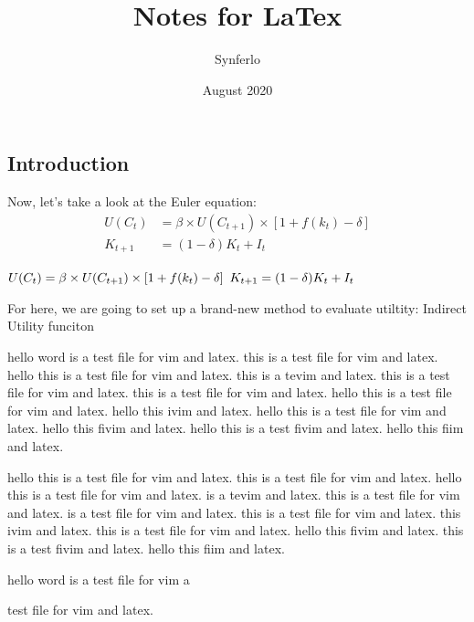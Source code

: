 \documentclass{article}
\title{Notes for LaTex}
\author{Synferlo}
\date{August 2020}
\begin{document}
\begin{spacing}{1.5}
\maketitle

\newpage
\section{Introduction}

Now, let's take a look at the Euler equation:\\

\begin{equation}
    \begin{aligned}
        U(C_{t})&=\beta\times U(C_{t+1})\times[1+f(k_{t})-\delta]\\
        K_{t+1}&=(1-\delta)K_{t} + I_{t}
    \end{aligned}
\end{equation}

 $U(C_{t})=\beta\times U(C_{t+1})\times[1+f(k_{t})-\delta]\\$
 $K_{t+1}=(1-\delta)K_{t} + I_{t}\\$


For here, we are going to set up a brand-new method to evaluate utiltity:
Indirect Utility funciton 


hello word is a test file for vim and latex.
this is a test file for vim and latex.
hello this is a test file for vim and latex.
this is a tevim and latex.
this is a test file for vim and latex.
this is a test file for vim and latex.
hello this is a test file for vim and latex.
hello this ivim and latex.
hello this is a test file for vim and latex.
hello this fivim and latex.
hello this is a test fivim and latex.
hello this fiim and latex.



hello this is a test file for vim and latex.
this is a test file for vim and latex.
hello this is a test file for vim and latex.
 is a tevim and latex.
this is a test file for vim and latex.
 is a test file for vim and latex.
 this is a test file for vim and latex.
 this ivim and latex.
 this is a test file for vim and latex.
hello this fivim and latex.
 this is a test fivim and latex.
hello this fiim and latex.




hello word is a test file for vim a



 test file for vim and latex.



\end{spacing}
\end{document}
